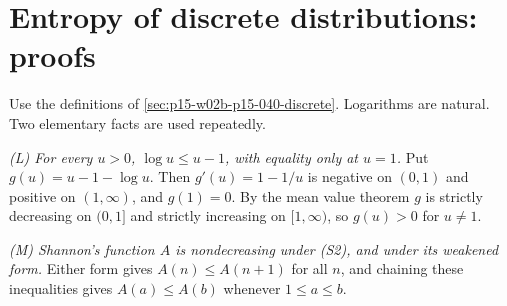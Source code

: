 \section{Entropy of discrete distributions: proofs}
\label{sec:annex-p15-w02b-p15-040-information}

Use the definitions of \cref{sec:p15-w02b-p15-040-discrete}. Logarithms
are natural. Two elementary facts are used repeatedly.

\emph{(L) For every \(u>0\), \(\log u\leq u-1\), with equality only at
\(u=1\).} Put \(g(u)=u-1-\log u\). Then \(g'(u)=1-1/u\) is negative
on \((0,1)\) and positive on \((1,\infty)\), and \(g(1)=0\). By the
mean value theorem \(g\) is strictly decreasing on \((0,1]\) and
strictly increasing on \([1,\infty)\), so \(g(u)>0\) for \(u\ne1\).

\emph{(M) Shannon's function \(A\) is nondecreasing under (S2), and
under its weakened form.} Either form gives \(A(n)\leq A(n+1)\) for all
\(n\), and chaining these inequalities gives \(A(a)\leq A(b)\) whenever
\(1\leq a\leq b\).

